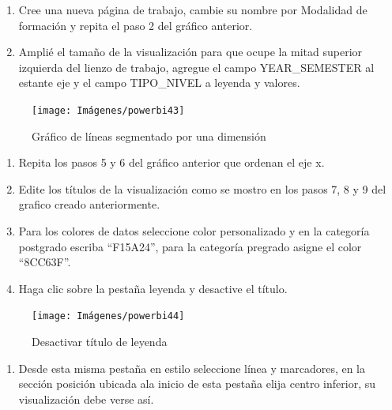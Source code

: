 \documentclass[
]{book}
\providecommand{\tightlist}{%
  \setlength{\itemsep}{0pt}\setlength{\parskip}{0pt}}
\begin{document}
\begin{enumerate}
\def\labelenumi{\arabic{enumi}.}
\item
  Cree una nueva página de trabajo, cambie su nombre por Modalidad de formación y repita el paso 2 del gráfico anterior.
\item
  Amplié el tamaño de la visualización para que ocupe la mitad superior izquierda del lienzo de trabajo, agregue el campo YEAR\_SEMESTER al estante eje y el campo TIPO\_NIVEL a leyenda y valores.
\end{enumerate}

\begin{figure}

{\centering \texttt{[image: Imágenes/powerbi43]} 

}

\caption{Gráfico de líneas segmentado por una dimensión}\label{fig:paso2lineassegmentadobi-fig}
\end{figure}

\begin{enumerate}
\def\labelenumi{\arabic{enumi}.}
\setcounter{enumi}{2}
\item
  Repita los pasos 5 y 6 del gráfico anterior que ordenan el eje x.
\item
  Edite los títulos de la visualización como se mostro en los pasos 7, 8 y 9 del grafico creado anteriormente.
\item
  Para los colores de datos seleccione color personalizado y en la categoría postgrado escriba ``F15A24'', para la categoría pregrado asigne el color ``8CC63F''.
\item
  Haga clic sobre la pestaña leyenda y desactive el título.
\end{enumerate}

\begin{figure}

{\centering \texttt{[image: Imágenes/powerbi44]} 

}

\caption{Desactivar título de leyenda}\label{fig:paso6lineassegmentadobi-fig}
\end{figure}

\begin{enumerate}
\def\labelenumi{\arabic{enumi}.}
\setcounter{enumi}{6}
\tightlist
\item
  Desde esta misma pestaña en estilo seleccione línea y marcadores, en la sección posición ubicada ala inicio de esta pestaña elija centro inferior, su visualización debe verse así.
\end{enumerate}
\end{document}
